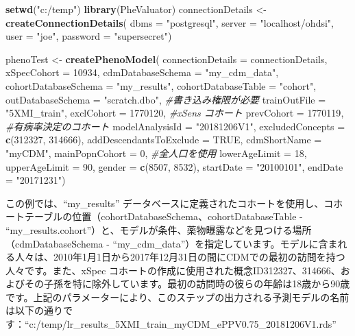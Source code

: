 \documentclass[
  11pt]{book}
\newenvironment{Shaded}{\begin{snugshade}}{\end{snugshade}}
\newcommand{\AttributeTok}[1]{\textcolor[rgb]{0.13,0.29,0.53}{#1}}
\newcommand{\CommentTok}[1]{\textcolor[rgb]{0.56,0.35,0.01}{\textit{#1}}}
\newcommand{\ConstantTok}[1]{\textcolor[rgb]{0.56,0.35,0.01}{#1}}
\newcommand{\DecValTok}[1]{\textcolor[rgb]{0.00,0.00,0.81}{#1}}
\newcommand{\FunctionTok}[1]{\textcolor[rgb]{0.13,0.29,0.53}{\textbf{#1}}}
\newcommand{\NormalTok}[1]{#1}
\newcommand{\OtherTok}[1]{\textcolor[rgb]{0.56,0.35,0.01}{#1}}
\newcommand{\StringTok}[1]{\textcolor[rgb]{0.31,0.60,0.02}{#1}}
\theoremstyle{definition}
\theoremstyle{definition}
\theoremstyle{definition}
\theoremstyle{definition}
\theoremstyle{remark}
\begin{document}
\begin{Shaded}
\begin{Highlighting}[]
\FunctionTok{setwd}\NormalTok{(}\StringTok{"c:/temp"}\NormalTok{)}
\FunctionTok{library}\NormalTok{(PheValuator)}
\NormalTok{connectionDetails }\OtherTok{\textless{}{-}} \FunctionTok{createConnectionDetails}\NormalTok{(}
  \AttributeTok{dbms =} \StringTok{"postgresql"}\NormalTok{,}
  \AttributeTok{server =} \StringTok{"localhost/ohdsi"}\NormalTok{,}
  \AttributeTok{user =} \StringTok{"joe"}\NormalTok{,}
  \AttributeTok{password =} \StringTok{"supersecret"}\NormalTok{)}

\NormalTok{phenoTest }\OtherTok{\textless{}{-}} \FunctionTok{createPhenoModel}\NormalTok{(}
  \AttributeTok{connectionDetails =}\NormalTok{ connectionDetails,}
  \AttributeTok{xSpecCohort =} \DecValTok{10934}\NormalTok{,}
  \AttributeTok{cdmDatabaseSchema =} \StringTok{"my\_cdm\_data"}\NormalTok{,}
  \AttributeTok{cohortDatabaseSchema =} \StringTok{"my\_results"}\NormalTok{,}
  \AttributeTok{cohortDatabaseTable =} \StringTok{"cohort"}\NormalTok{,}
  \AttributeTok{outDatabaseSchema =} \StringTok{"scratch.dbo"}\NormalTok{, }\CommentTok{\#書き込み権限が必要}
  \AttributeTok{trainOutFile =} \StringTok{"5XMI\_train"}\NormalTok{,}
  \AttributeTok{exclCohort =} \DecValTok{1770120}\NormalTok{, }\CommentTok{\#xSens コホート}
  \AttributeTok{prevCohort =} \DecValTok{1770119}\NormalTok{, }\CommentTok{\#有病率決定のコホート}
  \AttributeTok{modelAnalysisId =} \StringTok{"20181206V1"}\NormalTok{,}
  \AttributeTok{excludedConcepts =} \FunctionTok{c}\NormalTok{(}\DecValTok{312327}\NormalTok{, }\DecValTok{314666}\NormalTok{),}
  \AttributeTok{addDescendantsToExclude =} \ConstantTok{TRUE}\NormalTok{,}
  \AttributeTok{cdmShortName =} \StringTok{"myCDM"}\NormalTok{,}
  \AttributeTok{mainPopnCohort =} \DecValTok{0}\NormalTok{, }\CommentTok{\#全人口を使用}
  \AttributeTok{lowerAgeLimit =} \DecValTok{18}\NormalTok{,}
  \AttributeTok{upperAgeLimit =} \DecValTok{90}\NormalTok{,}
  \AttributeTok{gender =} \FunctionTok{c}\NormalTok{(}\DecValTok{8507}\NormalTok{, }\DecValTok{8532}\NormalTok{),}
  \AttributeTok{startDate =} \StringTok{"20100101"}\NormalTok{,}
  \AttributeTok{endDate =} \StringTok{"20171231"}\NormalTok{)}
\end{Highlighting}
\end{Shaded}

この例では、``my\_results'' データベースに定義されたコホートを使用し、コホートテーブルの位置（cohortDatabaseSchema、cohortDatabaseTable - ``my\_results.cohort''）と、モデルが条件、薬物曝露などを見つける場所（cdmDatabaseSchema - ``my\_cdm\_data''）を指定しています。モデルに含まれる人々は、2010年1月1日から2017年12月31日の間にCDMでの最初の訪問を持つ人々です。また、xSpec コホートの作成に使用された概念ID312327、314666、およびその子孫を特に除外しています。最初の訪問時の彼らの年齢は18歳から90歳です。上記のパラメーターにより、このステップの出力される予測モデルの名前は以下の通りです：``c:/temp/lr\_results\_5XMI\_train\_myCDM\_ePPV0.75\_20181206V1.rds''
\end{document}
